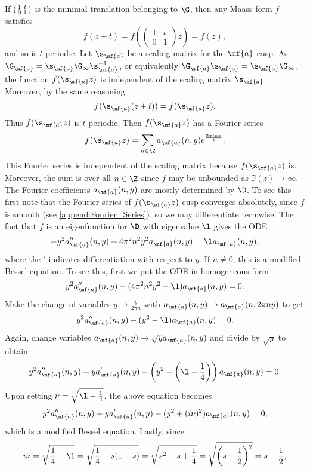     If $\begin{psmallmatrix} 1 & t \\ 0 & 1 \end{psmallmatrix}$ is the minimal translation belonging to $\G$, then any Maass form $f$ satisfies
    \[
      f(z+t) = f\left(\begin{pmatrix} 1 & t \\ 0 & 1 \end{pmatrix}z\right) = f(z),
    \]
    and so is $t$-periodic. Let $\s_{\mf{a}}$ be a scaling matrix for the $\mf{a}$ cusp. As $\G_{\mf{a}} = \s_{\mf{a}}\G_{\infty}\s_{\mf{a}}^{-1}$, or equivalently $\G_{\mf{a}}\s_{\mf{a}} = \s_{\mf{a}}\G_{\infty}$, the function $f(\s_{\mf{a}}z)$ is independent of the scaling matrix $\s_{\mf{a}}$. Moreover, by the same reasoning
    \[
      f(\s_{\mf{a}}(z+t)) = f(\s_{\mf{a}}z).
    \]
    Thus $f(\s_{\mf{a}}z)$ is $t$-periodic. Then $f(\s_{\mf{a}}z)$ has a Fourier series
    \[
      f(\s_{\mf{a}}z) = \sum_{n \in \Z}a_{\mf{a}}(n,y)e^{\frac{2\pi inx}{t}}.
    \]
    This Fourier series is independent of the scaling matrix because $f(\s_{\mf{a}}z)$ is. Moreover, the sum is over all $n \in \Z$ since $f$ may be unbounded as $\Im(z) \to \infty$. The Fourier coefficients $a_{\mf{a}}(n,y)$ are mostly determined by $\D$. To see this first note that the Fourier series of $f(\s_{\mf{a}}z)$ cusp converges absolutely, since $f$ is smooth (see \cref{append:Fourier_Series}), so we may differentiate termwise. The fact that $f$ is an eigenfunction for $\D$ with eigenvalue $\l$ gives the ODE
    \[
      -y^{2}a''_{\mf{a}}(n,y)+4\pi^{2}n^{2}y^{2}a_{\mf{a}}(n,y) = \l a_{\mf{a}}(n,y),
    \]
    where the $'$ indicates differentiation with respect to $y$. If $n \neq 0$, this is a modified Bessel equation. To see this, first we put the ODE in homogeneous form
    \[
      y^{2}a''_{\mf{a}}(n,y)-(4\pi^{2}n^{2}y^{2}-\l)a_{\mf{a}}(n,y) = 0.
    \]
    Make the change of variables $y \to \frac{y}{2\pi n}$ with $a_{\mf{a}}(n,y) \to a_{\mf{a}}(n,2\pi ny)$ to get
    \[
      y^{2}a''_{\mf{a}}(n,y)-(y^{2}-\l)a_{\mf{a}}(n,y) = 0.
    \]
    Again, change variables $a_{\mf{a}}(n,y) \to \sqrt{y}a_{\mf{a}}(n,y)$ and divide by $\sqrt{y}$ to obtain
    \[
      y^{2}a''_{\mf{a}}(n,y)+ya'_{\mf{a}}(n,y)-\left(y^{2}-\left(\l-\frac{1}{4}\right)\right)a_{\mf{a}}(n,y) = 0.
    \]
    Upon setting $\nu = \sqrt{\l-\frac{1}{4}}$, the above equation becomes
    \[
      y^{2}a''_{\mf{a}}(n,y)+ya'_{\mf{a}}(n,y)-(y^{2}+(i\nu)^{2})a_{\mf{a}}(n,y) = 0,
    \]
    which is a modified Bessel equation. Lastly, since
    \[
      i\nu = \sqrt{\frac{1}{4}-\l} = \sqrt{\frac{1}{4}-s(1-s)} = \sqrt{s^{2}-s+\frac{1}{4}} = \sqrt{\left(s-\frac{1}{2}\right)^{2}} = s-\frac{1}{2},
    \]
